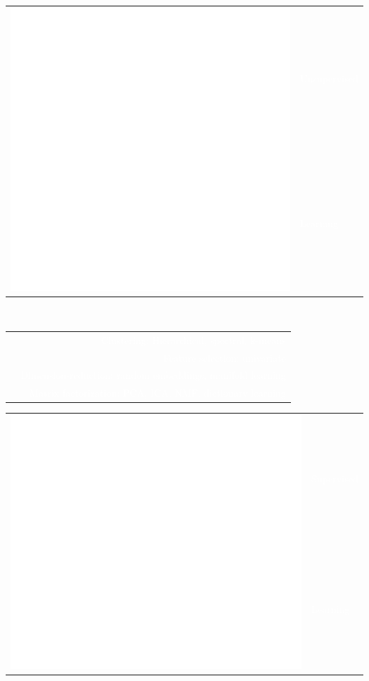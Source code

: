 \documentclass[letterpaper]{article}
\begin{document}
\begin{minipage}[t]{1.\linewidth}
\begin{minipage}{0.47\linewidth}
{\begin{minipage}{1\linewidth}
\begin{minipage}{1\linewidth}
		\begin{minipage}[t]{0.47\linewidth}
			\begin{tabularx}{1\textwidth}{rX}
				\multirow{2}{*}{\includegraphics[width=0.18\linewidth]{clustering.eps}}
				& \large\textmd{\textcolor{white}{Unsupervised}}\\
				& \large\textmd{\textcolor{white}{Learning}}\\
			\end{tabularx}\\
			\vspace{1ex}
			\begin{minipage}{1\linewidth}
				\textcolor{white}{\small
				\begin{tabularx}{1\textwidth}{lR}
					\smallskip			
					& \textmd{Clustering:} {\scriptsize Hierarchical, 
					spectral, k-means}\\
					\smallskip
					& \textmd{Feature selection:} {\scriptsize univariate}\\
					\smallskip
					& \textmd{Dimension-reduction:} {\scriptsize random 
					embeddings, manifold
					learning}\\
					\smallskip
					& \textmd{Matrix factorization:} {\scriptsize PCA, ICA, 
					NMF, dictionary 
					learning}\\
				\end{tabularx}
				} 
			\end{minipage}
			\vspace{2ex}			
		\end{minipage}
		\hfill
		\begin{minipage}[t]{0.47\linewidth}
			\begin{tabularx}{1\textwidth}{rX}
				\multirow{2}{*}{\includegraphics[width=0.18\linewidth]{supervized.eps}}
				& \large\textmd{\textcolor{white}{Supervised}}\\
				& \large\textmd{\textcolor{white}{Learning}}\\
			\end{tabularx}\\

\end{minipage}
\end{minipage}
\end{minipage}}
\end{minipage}
\end{minipage}
\end{document}

